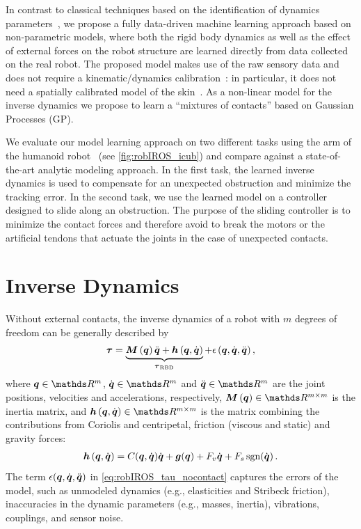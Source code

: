 %
In contrast to classical techniques based on the identification of dynamics parameters~\cite{Yamane2011calibration,Ogawa2014,Traversaro2013}, we propose a fully data-driven machine learning approach based on non-parametric models, where both the rigid body dynamics as well as the effect of external forces on the robot structure are learned directly from data collected on the real robot.
The proposed model makes use of the raw sensory data and does not require a kinematic/dynamics calibration~\cite{Yamane2011calibration,Ogawa2014,Traversaro2013}: in particular, it does not need a spatially calibrated model of the skin~\cite{DelPrete2011}.
As a non-linear model for the inverse dynamics we propose to learn a ``mixtures of contacts'' based on Gaussian Processes (GP).

We evaluate our model learning approach on two different tasks using the arm of the \robot{} humanoid robot~\cite{Natale2013} (see \fig\ref{fig:robIROS_icub}) and compare against a state-of-the-art analytic modeling approach.
In the first task, the learned inverse dynamics is used to compensate for an unexpected obstruction and minimize the tracking error.
In the second task, we use the learned model on a controller designed to slide along an obstruction. 
The purpose of the sliding controller is to minimize the contact forces and therefore avoid to break the motors or the artificial tendons that actuate the joints in the case of unexpected contacts.

    

\section{Inverse Dynamics}
\label{sec:robIROS_problem}



Without external contacts, the inverse dynamics of a robot with $m$ degrees of freedom can be generally described by 
%
\begin{align}
  \boldsymbol{\tau} = \underbrace{\boldsymbol M \left( \boldsymbol q \right)\ddot{\boldsymbol q} + \boldsymbol{h} \left(\boldsymbol q,\dot{\boldsymbol q} \right)}_{\boldsymbol{\tau}_\text{RBD}} + \epsilon\,(\boldsymbol q,\dot{\boldsymbol q},\ddot{\boldsymbol q}) \,,
  \label{eq:robIROS_tau_nocontact}
\end{align}
%
where $\q\in \R^{m}$, $\dq \in \R^{m}$ and $\ddq \in \R^{m}$ are the joint positions, velocities and accelerations, respectively, $\inertiaMatrix \in \R^{m \times m}$ is the inertia matrix, and $\Hmatrix \in \R^{m \times m}$ is the matrix combining the contributions from Coriolis and centripetal, friction (viscous and static) and gravity forces:
%
\begin{align}
	\boldsymbol{h} \left(\boldsymbol q,\dot{\boldsymbol q} \right) = C(\boldsymbol q,\dot{\boldsymbol q})\dot{\boldsymbol q} + \boldsymbol{g}(\boldsymbol q) + F_v \dot{\boldsymbol q} + F_s \,\text{sgn}(\dot{\boldsymbol q}) \,.
\end{align}
%
The term $\epsilon(\boldsymbol q,\dot{\boldsymbol q},\ddot{\boldsymbol q})$ in \eq\eqref{eq:robIROS_tau_nocontact} captures the errors of the model,
such as unmodeled dynamics (e.g., elasticities and Stribeck friction),
inaccuracies in the dynamic parameters (e.g., masses, inertia),
vibrations, couplings, and sensor noise. 

